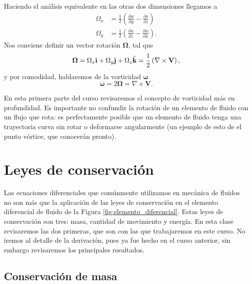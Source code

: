 Haciendo el análisis equivalente en las otras dos dimensiones llegamos a
%
\begin{align}
\Omega_x &= \frac{1}{2}\left(\frac{\partial w}{\partial y} -\frac{\partial v}{\partial z}\right) \nonumber \\
\Omega_y &= \frac{1}{2}\left(\frac{\partial u}{\partial z} -\frac{\partial w}{\partial x}\right).
\end{align}
%
Nos conviene definir un vector rotación $\boldsymbol{\Omega}$, tal que
%
\begin{equation}
\boldsymbol{\Omega} = \Omega_x \ihat + \Omega_y \jhat + \Omega_z \khat = \frac{1}{2}\left(\nabla\times\mathbf{V}\right),
\end{equation}
%
y por comodidad, hablaremos de la vorticidad $\boldsymbol{\omega}$
%
\begin{equation}\label{eq:vorticidad}
\boldsymbol{\omega} = 2\boldsymbol{\Omega} = \nabla\times\mathbf{V}.
\end{equation}

En esta primera parte del curso revisaremos el concepto de vorticidad más en profundidad.
Es importante no confundir la rotación de un elemento de fluido con un flujo que rota: es perfectamente posible que un elemento de fluido tenga una trayectoria curva sin rotar o deformarse angularmente (un ejemplo de esto de el punto vórtice, que conocerán pronto).

\section*{Leyes de conservación}

Las ecuaciones diferenciales que comúnmente utilizamos en mecánica de fluidos no son más que la aplicación de las leyes de conservación en el elemento diferencial de fluido de la Figura \ref{fig:elemento_diferencial}.
Estas leyes de conservación son tres: masa, cantidad de movimiento y energía.
En esta clase revisaremos las dos primeras, que son con las que trabajaremos en este curso. 
No iremos al detalle de la derivación, pues ya fue hecho en el curso anterior, sin embargo revisaremos los principales resultados.

\subsection*{Conservación de masa}

